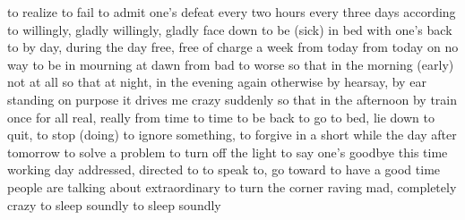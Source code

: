 {to realize}
{to fail}
{to admit one’s defeat}
{every two hours}
{every three days}
{according to}
{willingly, gladly}
{willingly, gladly}
{face down}
{to be (sick) in bed}
{with one’s back to}
{by day, during the day}
{free, free of charge}
{a week from today}
{from today on}
{no way}
{to be in mourning}
{at dawn}
{from bad to worse}
{so that}
{in the morning (early)}
{not at all}
{so that}
{at night, in the evening}
{again}
{otherwise}
{by hearsay, by ear}
{standing}
{on purpose}
{it drives me crazy}
{suddenly}
{so that}
{in the afternoon}
{by train}
{once for all}
{real, really}
{from time to time}
{to be back}
{to go to bed, lie down}
{to quit, to stop (doing)}
{to ignore something, to forgive}
{in a short while}
{the day after tomorrow}
{to solve a problem}
{to turn off the light}
{to say one’s goodbye}
{this time}
{working day}
{addressed, directed to}
{to speak to, go toward}
{to have a good time}
{people are talking about}
{extraordinary}
{to turn the corner}
{raving mad, completely crazy}
{to sleep soundly}
{to sleep soundly}

